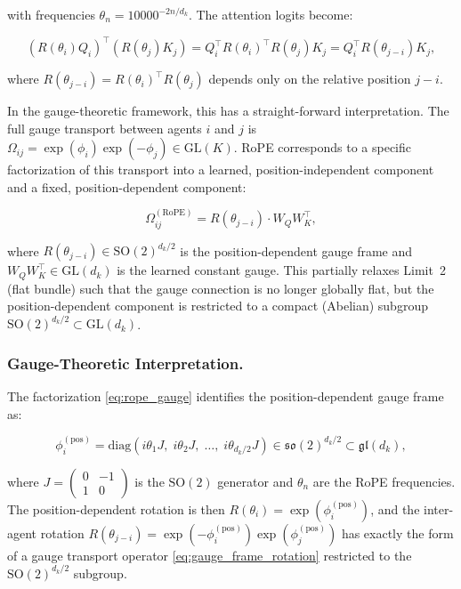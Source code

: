 \documentclass[twoside,11pt]{article}
\begin{document}
with frequencies $\theta_n = 10000^{-2n/d_k}$. The attention logits become:

\begin{equation}
(R(\theta_i) Q_i)^\top (R(\theta_j) K_j) = Q_i^\top R(\theta_i)^\top R(\theta_j) K_j = Q_i^\top R(\theta_{j-i}) K_j,
\label{eq:rope_relative}
\end{equation}

where $R(\theta_{j-i}) = R(\theta_i)^\top R(\theta_j)$ depends only on the relative position $j - i$.

In the gauge-theoretic framework, this has a straight-forward interpretation. The full gauge transport between agents $i$ and $j$ is $\Omega_{ij} = \exp(\phi_i)\exp(-\phi_j) \in \mathrm{GL}(K)$. RoPE corresponds to a specific factorization of this transport into a learned, position-independent component and a fixed, position-dependent component:

\begin{equation}
\Omega_{ij}^{(\mathrm{RoPE})} = R(\theta_{j-i}) \cdot W_Q W_K^\top,
\label{eq:rope_gauge}
\end{equation}

where $R(\theta_{j-i}) \in \mathrm{SO}(2)^{d_k/2}$ is the position-dependent gauge frame and $W_Q W_K^\top \in \mathrm{GL}(d_k)$ is the learned constant gauge. This partially relaxes Limit~2 (flat bundle) such that the gauge connection is no longer globally flat, but the position-dependent component is restricted to a compact (Abelian) subgroup $\mathrm{SO}(2)^{d_k/2} \subset \mathrm{GL}(d_k)$.

\subsubsection{Gauge-Theoretic Interpretation.}

The factorization \eqref{eq:rope_gauge} identifies the position-dependent gauge frame as:

\begin{equation}
\phi_i^{(\mathrm{pos})} = \mathrm{diag}(i\theta_1 J, \; i\theta_2 J, \; \ldots, \; i\theta_{d_k/2} J) \in \mathfrak{so}(2)^{d_k/2} \subset \mathfrak{gl}(d_k),
\label{eq:rope_lie_algebra}
\end{equation}

where $J = \left(\begin{smallmatrix} 0 & -1 \\ 1 & 0 \end{smallmatrix}\right)$ is the $\mathrm{SO}(2)$ generator and $\theta_n$ are the RoPE frequencies. The position-dependent rotation is then $R(\theta_i) = \exp(\phi_i^{(\mathrm{pos})})$, and the inter-agent rotation $R(\theta_{j-i}) = \exp(-\phi_i^{(\mathrm{pos})})\exp(\phi_j^{(\mathrm{pos})})$ has exactly the form of a gauge transport operator \eqref{eq:gauge_frame_rotation} restricted to the $\mathrm{SO}(2)^{d_k/2}$ subgroup. 
\end{document}
